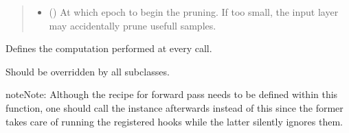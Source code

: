 \documentclass[letterpaper,10pt,english]{sphinxmanual}
\begin{document}
\begin{fulllineitems}
\begin{quote}
\begin{description}
\begin{itemize}
\item {} 
\sphinxAtStartPar
{} (\sphinxstyleliteralemphasis{\sphinxupquote{, }}) \textendash{} At which epoch to begin the pruning. If too small, the input layer may
accidentally prune usefull samples.

\end{itemize}

\end{description}\end{quote}

\begin{fulllineitems}
\label{\detokenize{MLSCAlib.Architectures:MLSCAlib.Architectures.torch_models.MLPexp.eval}}
\pysigstartsignatures
{}
\pysigstopsignatures
\end{fulllineitems}


\begin{fulllineitems}
\label{\detokenize{MLSCAlib.Architectures:MLSCAlib.Architectures.torch_models.MLPexp.forward}}
\pysigstartsignatures
{}
\pysigstopsignatures
\sphinxAtStartPar
Defines the computation performed at every call.

\sphinxAtStartPar
Should be overridden by all subclasses.

\begin{sphinxadmonition}{note}{Note:}
\sphinxAtStartPar
Although the recipe for forward pass needs to be defined within
this function, one should call the  instance afterwards
instead of this since the former takes care of running the
registered hooks while the latter silently ignores them.
\end{sphinxadmonition}

\end{fulllineitems}



\end{fulllineitems}
\end{document}
